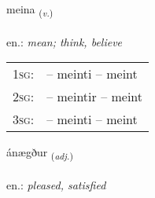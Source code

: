 \documentclass[frontgrid, backgrid]{flacards}\usepackage[]{graphicx}\usepackage[]{xcolor}
\begin{document}
\renewcommand{\flhead}{\vskip5pt \fboxsep=0pt {\small\bfseries\footnotesize Sagnorð | Verb}}
\renewcommand{\fcfoot}{\vskip5pt \fboxsep=0pt \hspace{2pt}{\small\bfseries\footnotesize 2K}}

\renewcommand{\blhead}{\vskip5pt {\small\bfseries\footnotesize Sagnorð | Verb }}
\renewcommand{\bcfoot}{\vskip5pt \hspace{2pt}{\small\bfseries\footnotesize 2K}}


{meina \small{\textsubscript{(\textit{v.})}} \\[1ex] %
\textphonetic{[meiːna]} \\
en.: \emph{mean; think, believe} \\  [2ex]
\renewcommand*{\arraystretch}{0.8}
\begin{tabular}{p{1cm}l}
\textsc{1sg}: &  -- meinti -- meint \\ 
\textsc{2sg}: &  -- meintir -- meint \\ 
\textsc{3sg}: &  -- meinti -- meint \\ 
\end{tabular}
}

\renewcommand{\flhead}{\vskip5pt \fboxsep=0pt {\small\bfseries\footnotesize Lýsingarorð | Adjective}}
\renewcommand{\fcfoot}{\vskip5pt \fboxsep=0pt \hspace{2pt}{\small\bfseries\footnotesize 2K}}

\renewcommand{\blhead}{\vskip5pt {\small\bfseries\footnotesize Lýsingarorð | Adjective }}
\renewcommand{\bcfoot}{\vskip5pt \hspace{2pt}{\small\bfseries\footnotesize 2K}}


{ánægður \small{\textsubscript{(\textit{adj.})}} \\[1ex] %
\textphonetic{[auːnaiɣðʏr]} \\
en.: \emph{pleased, satisfied} \\  [2ex]
\renewcommand*{\arraystretch}{0.8}
}
\end{document}
